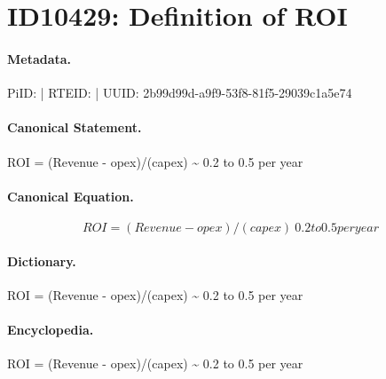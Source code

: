 \section*{ID10429: Definition of ROI}
\paragraph{Metadata.}
PiID:  | RTEID:  | UUID: 2b99d99d-a9f9-53f8-81f5-29039c1a5e74

\paragraph{Canonical Statement.}
ROI = (Revenue - opex)/(capex) \textasciitilde{} 0.2 to 0.5 per year

\paragraph{Canonical Equation.}
\[
ROI = (Revenue - opex)/(capex) ~ 0.2 to 0.5 per year
\]

\paragraph{Dictionary.}
ROI = (Revenue - opex)/(capex) \textasciitilde{} 0.2 to 0.5 per year

\paragraph{Encyclopedia.}
ROI = (Revenue - opex)/(capex) \textasciitilde{} 0.2 to 0.5 per year

